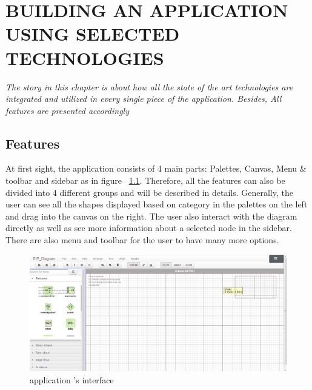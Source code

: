 \documentclass[14pt,a4paper]{extreport}
\begin{document}
\chapter{BUILDING AN APPLICATION USING SELECTED TECHNOLOGIES}
\textsl{The story in this chapter is about how all the state of the art technologies are integrated and utilized in every single piece of the application. Besides, All features are presented accordingly }
	\newpage 
	
	\section{Features}
			At first sight, the application consists of 4 main parts: Palettes, Canvas, Menu \& toolbar and sidebar as in figure ~\ref{interface}. Therefore, all the features can also be  divided into 4 different groups and will be described in details. Generally, the user can see all the shapes displayed based on category in the palettes on the left and drag into the canvas on the right. The user also interact with the diagram directly as well as see more information about a selected node in the sidebar. There are also menu and toolbar for the user to have many more options.
			\begin{figure}[ht]
				\begin{center}
					\includegraphics[scale=0.5]{interface.png}
					\caption{application 's interface}
					\label{interface}
				\end{center}
			\end{figure}
			
\end{document}
